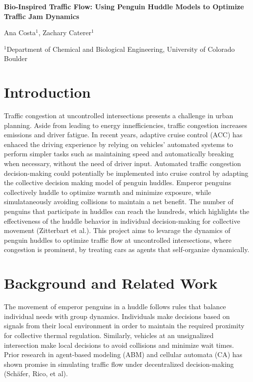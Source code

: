 \documentclass[10pt]{article}
\begin{document}
\begin{center}    
    \textbf{\Large 
    Bio-Inspired Traffic Flow: Using Penguin Huddle Models to Optimize Traffic Jam Dynamics
    }\\
    
    \vspace{0.5cm}

    Ana Costa$^1$, Zachary Caterer$^1$\\
    
    \vspace{0.5cm}
    
    $^1$Department of Chemical and Biological Engineering, University of Colorado Boulder\\
\end{center}


\section*{Introduction}

Traffic congestion at uncontrolled intersections presents a challenge in urban planning. Aside from leading to energy innefficiencies, traffic congestion
increases emissions and driver fatigue. In recent years, adaptive cruise control (ACC) has enhaced the driving experience by relying on vehicles' automated
systems to perform simpler tasks such as maintaining speed and automatically breaking when necessary, without the need of driver input. Automated traffic congestion decision-making could
potentially be implemented into cruise control by adapting the collective decision making model of penguin huddles. Emperor penguins collectively huddle to optimize warmth and minimize exposure, while
simulataneously avoiding collisions to maintain a net benefit. The number of penguins that participate in huddles can reach the hundreds, which highlights
the effectiveness of the huddle behavior in individual decision-making for collective movement (Zitterbart et al.). This project aims to levarage the dynamics of penguin huddles to optimize traffic flow at uncontrolled intersections,
where congestion is prominent, by treating cars as agents that self-organize dynamically. 

\section*{Background and Related Work}

The movement of emperor penguins in a huddle follows rules that balance individual needs with group dynamics. Individuals make decisions based on signals from their local
environment in order to maintain the required proximity for collective thermal regulation. Similarly, vehicles at an unsignalized intersection make local decisions to avoid 
collisions and minimize wait times. Prior research in agent-based modeling (ABM) and cellular automata (CA) has shown promise in simulating traffic flow under decentralized decision-making (Schäfer, Rico, et al).
\end{document}
